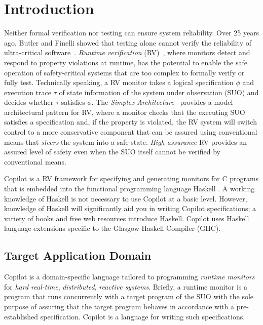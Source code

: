 
\section{Introduction} \label{sec:introduction}


Neither formal verification nor testing can ensure system reliability.
%
Over 25 years ago, Butler and Finelli showed that testing alone cannot verify
the reliability of ultra-critical software~\cite{butler}.
%
\emph{Runtime verification} (RV)~\cite{monitors}, where monitors detect and
respond to property violations at runtime, has the potential to enable the safe
operation of safety-critical systems that are too complex to formally verify or
fully test.
%
Technically speaking, a RV monitor takes a logical specification $\phi$ and
execution trace $\tau$ of state information of the system under observation
(SUO) and decides whether $\tau$ satisfies $\phi$.
%
The \emph{Simplex Architecture}~\cite{simplex} provides a model architectural
pattern for RV, where a monitor checks that the executing SUO satisfies a
specification and, if the property is violated, the RV system will switch
control to a more conservative component that can be assured using conventional
means that \emph{steers} the system into a safe state.
%
\emph{High-assurance} RV provides an assured level of safety even when the SUO
itself cannot be verified by conventional means.

Copilot is a RV framework for specifying and generating monitors for C programs
that is embedded into the functional programming language Haskell
\cite{PeytonJones02}.
%
 A working knowledge of Haskell is not necessary to use Copilot at a basic
level.
%
 However, knowledge of Haskell will significantly aid you in writing Copilot
specifications;  a variety of books and free web resources introduce Haskell.
%
  Copilot uses Haskell language extensions specific to the Glasgow Haskell
Compiler (GHC).

\subsection{Target Application Domain} \label{domain}


Copilot is a domain-specific language tailored to programming \emph{runtime
monitors} for \emph{hard real-time}, \emph{distributed}, \emph{reactive
systems}.
%
Briefly, a runtime monitor is a program that runs concurrently with a target
program of the SUO with the sole purpose of assuring that the target program
behaves in accordance with a pre-established specification.
%
 Copilot is a language for writing such specifications.
%

